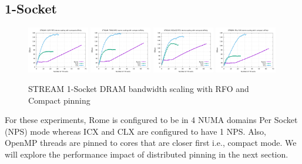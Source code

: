 \documentclass{article}
\begin{document}
\subsection{1-Socket}
\begin{figure}[!ht]
    \centering
    \includegraphics[width=0.24\textwidth]{../mem_bw_scale/mb_scale_compact_Copy_rfo}
    \includegraphics[width=0.24\textwidth]{../mem_bw_scale/mb_scale_compact_Triad_rfo}
    \includegraphics[width=0.24\textwidth]{../mem_bw_scale/mb_scale_compact_Reduce_rfo}
    \includegraphics[width=0.24\textwidth]{../mem_bw_scale/mb_scale_compact_Fill_rfo}
    \caption{STREAM 1-Socket DRAM bandwidth scaling with RFO and Compact pinning}
    \label{figure:mem_bw_scale_compact_rfo}
\end{figure}

For these experiments, Rome is configured to be in 4 NUMA domains Per Socket (NPS) mode whereas ICX and CLX are configured to have 1 NPS. Also, OpenMP threads are pinned to cores that are closer first i.e., compact mode. We will explore the performance impact of distributed pinning in the next section.
\end{document}
